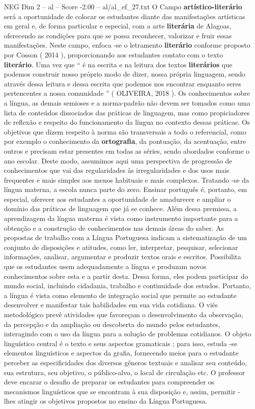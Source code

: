 \begin{textsample}{NEG Dim 2 – al – Score -2.00 – al/al\_ef\_27.txt}
O Campo \textbf{artístico-literário} será a oportunidade de colocar os estudantes diante das manifestações artísticas em geral e, de forma particular e especial, com a arte \textbf{literária} de Alagoas, oferecendo as condições para que se possa reconhecer, valorizar e fruir essas manifestações.
Neste campo, enfoca -se o letramento \textbf{literário} conforme proposto por Cosson ( 2014 ), proporcionando aos estudantes contato com o texto \textbf{literário}.
Uma vez que “ é na escrita e na leitura dos textos \textbf{literários} que podemos construir nosso próprio modo de dizer, nossa própria linguagem, sendo através dessa leitura e dessa escrita que podemos nos encontrar enquanto seres pertencentes a nossa comunidade ” ( OLIVEIRA, 2018 ).
Os conhecimentos sobre a língua, as demais semioses e a norma-padrão não devem ser tomados como uma lista de conteúdos dissociados das práticas de linguagem, mas como propiciadores de reflexão e respeito do funcionamento da língua no contexto dessas práticas.
Os objetivos que dizem respeito à norma são transversais a todo o referencial, como por exemplo o conhecimento da \textbf{ortografia}, da pontuação, da acentuação, entre outros e precisam estar presentes em todas as séries, sendo abordados conforme o ano escolar.
Deste modo, assumimos aqui uma perspectiva de progressão de conhecimentos que vai das regularidades às irregularidades e dos usos mais frequentes e mais simples aos menos habituais e mais complexos.
Tratando -se da língua materna, a escola nunca parte do zero.
Ensinar português é, portanto, em especial, oferecer aos estudantes a oportunidade de amadurecer e ampliar o domínio das práticas de linguagem que já se conhece.
Além dessa premissa, a aprendizagem da língua materna é vista como instrumento importante para a obtenção e a construção de conhecimentos nas demais áreas do saber.
As propostas de trabalho com a Língua Portuguesa indicam a sistematização de um conjunto de disposições e atitudes, como ler, interpretar, pesquisar, selecionar informações, analisar, argumentar e produzir textos orais e escritos.
Possibilita que os estudantes usem adequadamente a língua e produzam novos conhecimentos sobre esta e a partir desta.
Dessa forma, eles podem participar do mundo social, incluindo cidadania, trabalho e continuidade dos estudos.
Portanto, a língua é vista como elemento de integração social que permite ao estudante desenvolver e manifestar tais habilidades em sua vida cotidiana.
O viés metodológico prevê atividades que favoreçam o desenvolvimento da observação, da percepção e da ampliação ou descoberta do mundo pelos estudantes, interagindo com o uso da língua para a solução de problemas cotidianos.
O objeto linguístico central é o texto e seus aspectos gramaticais ; para isso, estuda -se elementos linguísticos e aspectos da grafia, fornecendo meios para o estudante perceber as especificidades dos diversos gêneros textuais e analisar seu conteúdo, sua estrutura, seu objetivo, o público-alvo, o local de circulação etc.
O professor deve encarar o desafio de preparar os estudantes para compreender os mecanismos linguísticos que se encontram à sua disposição e, assim, permitir -lhes atingir os objetivos propostos no ensino da Língua Portuguesa.

\end{textsample}
